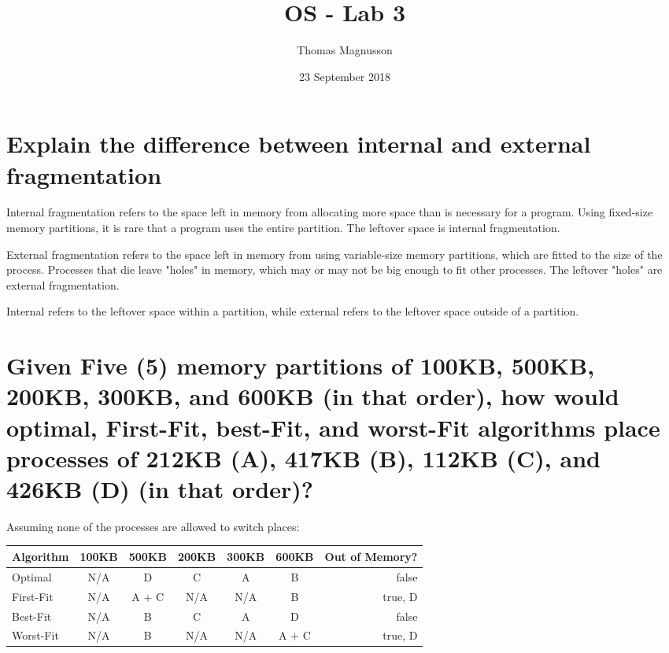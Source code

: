 \documentclass{article}
\title{OS - Lab 3}
\author{Thomas Magnusson}
\date{23 September 2018}
\begin{document}
\maketitle

\section{Explain the difference between internal and external fragmentation}

Internal fragmentation refers to the space left in memory from allocating more space than is necessary for a program. Using fixed-size memory partitions, it is rare that a program uses the entire partition. The leftover space is internal fragmentation.

External fragmentation refers to the space left in memory from using variable-size memory partitions, which are fitted to the size of the process. Processes that die leave "holes" in memory, which may or may not be big enough to fit other processes. The leftover "holes" are external fragmentation.

Internal refers to the leftover space within a partition, while external refers to the leftover space outside of a partition.

\section{Given	Five	(5)	memory	partitions	of	100KB,	500KB,	200KB,	300KB,	and	600KB	(in	that	
order),	how	would	optimal,	First-Fit,	best-Fit,	and	worst-Fit	algorithms	place	processes	
of	212KB (A),	417KB (B),	112KB (C),	and	426KB (D)	(in	that	order)?}

Assuming none of the processes are allowed to switch places:

\begin{center}
  \begin{tabular}{ l | c | c | c | c | c | r }
    \hline
    \textbf{Algorithm} & \textbf{100KB} & \textbf{500KB} & \textbf{200KB} & \textbf{300KB} & \textbf{600KB} & \textbf{Out of Memory?}\\ \hline
    Optimal & N/A & D & C & A & B & false \\ \hline
    First-Fit & N/A & A + C & N/A & N/A & B & true, D \\ \hline
    Best-Fit & N/A & B & C & A & D & false \\ \hline
    Worst-Fit & N/A & B & N/A & N/A & A + C & true, D \\ \hline
  \end{tabular}
\end{center}
\end{document}
